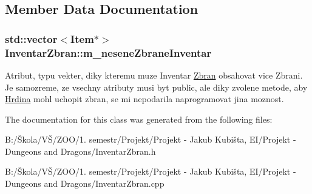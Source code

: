 \subsection{Member Data Documentation}
\hypertarget{class_inventar_zbran_a324d36769f1d1d55da5453aaf3089f56}{
\subsubsection[{m\-\_\-nesene\-Zbrane\-Inventar}]{\setlength{\rightskip}{0pt plus 5cm}std\-::vector$<${\bf Item}$\ast$$>$ Inventar\-Zbran\-::m\-\_\-nesene\-Zbrane\-Inventar}}\label{class_inventar_zbran_a324d36769f1d1d55da5453aaf3089f56}
Atribut, typu vekter, diky kteremu muze Inventar \hyperlink{class_zbran}{Zbran} obsahovat vice Zbrani. Je samozreme, ze vsechny atributy musi byt public, ale diky zvolene metode, aby \hyperlink{class_hrdina}{Hrdina} mohl uchopit zbran, se mi nepodarila naprogramovat jina moznost. 

The documentation for this class was generated from the following files\-:\begin{DoxyCompactItemize}
\item 
B\-:/Škola/\-VŠ/\-Z\-O\-O/1. semestr/\-Projekt/\-Projekt -\/ Jakub Kubišta, E\-I/\-Projekt -\/ Dungeons and Dragons/Inventar\-Zbran.\-h\item 
B\-:/Škola/\-VŠ/\-Z\-O\-O/1. semestr/\-Projekt/\-Projekt -\/ Jakub Kubišta, E\-I/\-Projekt -\/ Dungeons and Dragons/Inventar\-Zbran.\-cpp\end{DoxyCompactItemize}
